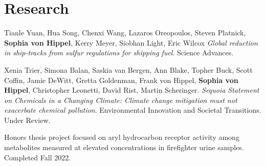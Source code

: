 \section{\mysidestyle Research}


Tianle Yuan, Hua Song, Chenxi Wang, Lazaros Oreopoulos, Steven Platnick, \textbf{Sophia von Hippel}, Kerry Meyer, Siobhan Light, Eric Wilcox \textit{Global reduction in ship-tracks from sulfur regulations for shipping fuel}. Science Advances.

Xenia Trier, Simona Balan, Saskia van Bergen, Ann Blake, Topher Buck, Scott Coffin, Jamie DeWitt, Gretta Goldenman, Frank von Hippel, \textbf{Sophia von Hippel}, Christopher Leonetti, David Rist, Martin Scheringer. \textit{Sequoia Statement on Chemicals in a Changing Climate: Climate change mitigation must not exacerbate chemical pollution}. Environmental Innovation and Societal Transitions. Under Review.

Honors thesis project focused on aryl hydrocarbon receptor activity among metabolites measured at elevated concentrations in firefighter urine samples. Completed Fall 2022.